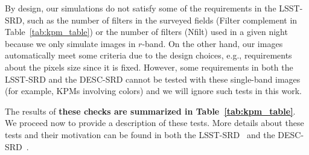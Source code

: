 \documentclass[twocolumn]{aastex62}
\begin{document}
By design, our simulations do not satisfy some of the requirements in the LSST-SRD, such as the number of filters in the surveyed fields (Filter complement in Table~\ref{tab:kpm_table}) or the number of filters (Nfilt) used in a given night because we only simulate images in $r$-band. On the other hand, our images automatically meet some criteria due to the design choices, e.g., requirements about the pixels size since it is fixed. However, some requirements in both the LSST-SRD and the DESC-SRD cannot be tested with these single-band images (for example, KPMs involving colors) and we will ignore such tests in this work.

The results of {\bf these checks are summarized in Table~\ref{tab:kpm_table}}. We proceed now to provide a description of these tests. More details about these tests and their motivation can be found in both the LSST-SRD~\citep{LPM-17} and the DESC-SRD~\citep{2018arXiv180901669T}.
\end{document}
